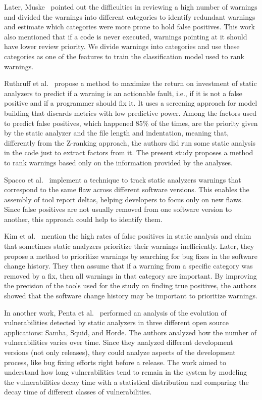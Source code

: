 Later, Muske~\cite{muske2013review} pointed out the difficulties in reviewing a high
number of warnings and divided the warnings into different categories to identify
redundant warnings and estimate which categories were more prone to hold false
positives. This work also mentioned that if a code is never executed,
warnings pointing at it should have lower review priority.
We divide warnings into categories and use these categories as one of the features
to train the classification model used to rank warnings.

Ruthruff et al.~\cite{ruthruff_predicting_2008} propose a method to maximize
the return on investment of static analyzers to predict if a warning is an
actionable fault, i.e., if it is not a false positive and if a programmer
should fix it. It uses a screening approach for model building that discards
metrics with low predictive power. Among the factors used to predict false
positives, which happened 85\% of the times, are the priority given by the
static analyzer and the file length and indentation, meaning that, differently
from the Z-ranking approach, the authors did run some static analysis in the
code just to extract factors from it. The present study proposes a method to
rank warnings based only on the information provided by the analyses.

Spacco et al.~\cite{spacco_tracking_2006} implement a technique
to track static analyzers warnings that correspond to the same flaw across
different software versions. This enables the assembly of tool report
deltas, helping developers to focus only on new flaws. Since false positives
are not usually removed from one software version to another, this approach
could help to identify them.

Kim et al.~\cite{kim_which_2007} mention the high rates of false positives in
static analysis and claim that sometimes static analyzers prioritize their
warnings inefficiently. Later, they propose a method to prioritize
warnings by searching for bug fixes in the software change history. They then
assume that if a warning from a specific category was removed by a fix, then
all warnings in that category are important. By improving the precision of the
tools used for the study on finding true positives, the authors showed that the
software change history may be important to prioritize warnings.

In another work, Penta et al.~\cite{penta_evolution_2008} performed an analysis
of the evolution of vulnerabilities detected by static analyzers in three
different open source applications: Samba, Squid, and Horde. The authors
analyzed how the number of vulnerabilities varies over time. Since they
analyzed different development versions (not only releases), they could analyze
aspects of the development process, like bug fixing efforts right before a
release. The work aimed to understand how long vulnerabilities tend
to remain in the system by modeling the vulnerabilities decay time with a
statistical distribution and comparing the decay time of different classes of
vulnerabilities.

